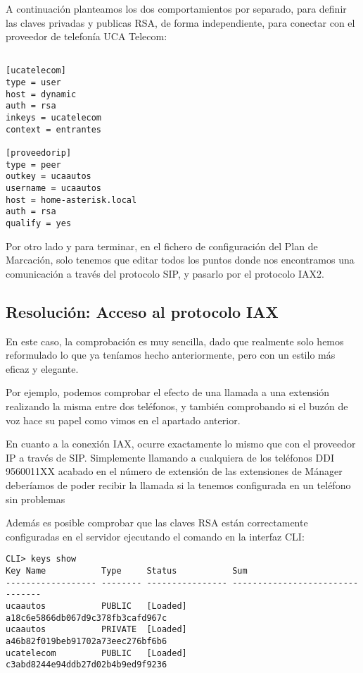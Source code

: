 A continuación planteamos los dos comportamientos por separado, para definir las claves privadas y publicas RSA, de forma independiente, para conectar con el proveedor de telefonía UCA Telecom:

\begin{lstlisting}[style=bash,title={/etc/asterisk/iax.conf}]

[ucatelecom]
type = user
host = dynamic
auth = rsa
inkeys = ucatelecom
context = entrantes

[proveedorip]
type = peer
outkey = ucaautos
username = ucaautos
host = home-asterisk.local
auth = rsa
qualify = yes

\end{lstlisting}

Por otro lado y para terminar, en el fichero de configuración del Plan de Marcación, solo tenemos que editar todos los puntos donde nos encontramos una comunicación a través del protocolo SIP, y pasarlo por el protocolo IAX2. 

\subsection{Resolución: Acceso al protocolo IAX}

En este caso, la comprobación es muy sencilla, dado que realmente solo hemos reformulado lo que ya teníamos hecho anteriormente, pero con un estilo más eficaz y elegante. 

Por ejemplo, podemos comprobar el efecto de una llamada a una extensión realizando la misma entre dos teléfonos, y también comprobando si el buzón de voz hace su papel como vimos en el apartado anterior.

En cuanto a la conexión IAX, ocurre exactamente lo mismo que con el proveedor IP a través de SIP. Simplemente llamando a cualquiera de los teléfonos DDI 9560011XX acabado en el número de extensión de las extensiones de Mánager deberíamos de poder recibir la llamada si la tenemos configurada en un teléfono sin problemas

Además es posible comprobar que las claves RSA están correctamente configuradas en el servidor ejecutando el comando en la interfaz CLI:

\begin{lstlisting}[style=consola]
CLI> keys show
Key Name           Type     Status           Sum
------------------ -------- ---------------- --------------------------------
ucaautos           PUBLIC   [Loaded]         a18c6e5866db067d9c378fb3cafd967c
ucaautos           PRIVATE  [Loaded]         a46b82f019beb91702a73eec276bf6b6
ucatelecom         PUBLIC   [Loaded]         c3abd8244e94ddb27d02b4b9ed9f9236
\end{lstlisting}

